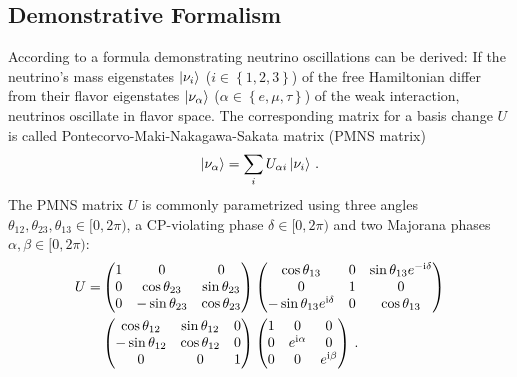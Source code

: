     \subsection{Demonstrative Formalism}
    According to \cite{zuber2011neutrino} a formula demonstrating neutrino oscillations can be derived:
    If the neutrino's mass eigenstates $\left|\nu_i\right\rangle$ ($i \in \left\{1, 2, 3\right\}$) of the free Hamiltonian differ from their flavor eigenstates $\left|\nu_\alpha\right\rangle$ ($\alpha \in \left\{e,\mu,\tau\right\}$) of the weak interaction, neutrinos oscillate in flavor space. The corresponding matrix for a basis change $U$ is called Pontecorvo-Maki-Nakagawa-Sakata matrix (PMNS matrix)
    \begin{equation}
        \left|\nu_\alpha\right\rangle = \sum_{i} U_{\alpha i} \left|\nu_i\right\rangle
        \text{\,.}
    \end{equation}
The PMNS matrix $U$ is commonly parametrized using three angles $\theta_{12}, \theta_{23}, \theta_{13} \in [0,2\pi)$, a CP-violating phase $\delta \in [0,2\pi)$ and two Majorana phases $\alpha, \beta \in [0,2\pi)$:
    \begin{align}
        \label{eq:PMNSmatrix}
        U =  
        &\begin{pmatrix} 
        1 & 0 & 0 \\ 
        0 & \cos\theta_{23} & \sin\theta_{23} \\ 
        0 & -\sin\theta_{23} & \cos\theta_{23} 
        \end{pmatrix}
        \begin{pmatrix} 
        \cos\theta_{13} & 0 & \sin\theta_{13}e^{-\mathrm{i}\delta} \\ 
        0 & 1 & 0 \\ 
        -\sin\theta_{13}e^{\mathrm{i}\delta} & 0 & \cos\theta_{13} 
        \end{pmatrix} \\ \notag
        &\begin{pmatrix} 
        \cos\theta_{12} & \sin\theta_{12} & 0 \\ 
        -\sin\theta_{12} & \cos\theta_{12} & 0 \\ 
        0 & 0 & 1 
        \end{pmatrix}
        \begin{pmatrix} 
        1 & 0 & 0 \\ 
        0 & e^{\mathrm{i}\alpha} & 0 \\ 
        0 & 0 & e^{\mathrm{i}\beta} 
        \end{pmatrix}
        \text{\,.}
    \end{align}
